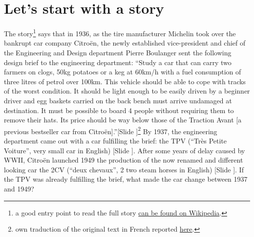 \documentclass{article}
\newcounter{slide}
\begin{document}
\section{Let's start with a story}
\label{sec:prologue}
The story\footnote{a good entry point to read the full story \href{https://en.wikipedia.org/wiki/Citro\%C3\%ABn_2CV}{can be found on Wikipedia}.} says that in 1936, as the tire manufacturer Michelin took over the bankrupt car company Citroën, the newly established vice-president and chief of the Engineering and Design department Pierre Boulanger sent the following design brief to the engineering department: ``Study a car that can carry two farmers on clogs, 50kg potatoes or a keg at 60km/h with a fuel consumption of three litres of petrol over 100km. This vehicle should be able to cope with tracks of the worst condition. It should be light enough to be easily driven by a beginner driver and egg baskets carried on the back bench must arrive undamaged at destination. It must be possible to board 4 people without requiring them to remove their hats. Its price should be way below those of the Traction Avant [a previous bestseller car from Citroën].''{\color{blue}[Slide ]}\footnote{own traduction of the original text in French reported \href{https://disciplines.ac-toulouse.fr/sii/sites/sii/files/ressources/ressources-eleves/outils-projets/cahier-des-charges-2cv-complet.pdf}{here}.} By 1937, the engineering department came out with a car fulfilling the brief: the TPV (``Très Petite Voiture'', very small car in English) {\color{blue}[Slide ]}. After some years of delay caused by WWII, Citroën launched 1949 the production of the now renamed and different looking car the 2CV (``deux chevaux'', 2 two steam horses in English) {\color{blue}[Slide ]}. If the TPV was already fulfilling the brief, what made the car change between 1937 and 1949?
\end{document}
